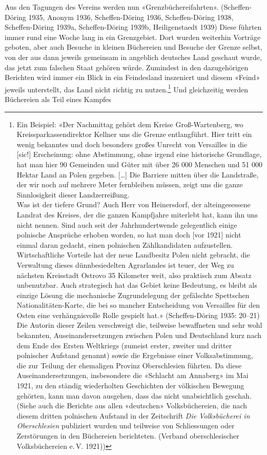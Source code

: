 \documentclass[a4paper,
fontsize=11pt,
oneside,
numbers=noperiodatend,
parskip=half-,
bibliography=totoc,
final
]{scrartcl}
\begin{document}
Aus den Tagungen des Vereins werden nun «Grenzbüchereifahrten».
(Scheffen-Döring 1935, Anonym 1936, Scheffen-Döring 1936,
Scheffen-Döring 1938, Scheffen-Döring 1939a, Scheffen-Döring 1939b,
Heiligenstaedt 1939) Diese führten immer rund eine Woche lang in ein
Grenzgebiet. Dort wurden weiterhin Vorträge geboten, aber auch Besuche
in kleinen Büchereien und Besuche der Grenze selbst, von der aus dann
jeweils gemeinsam in angeblich deutsches Land geschaut wurde, das jetzt
zum falschen Staat gehören würde. Zumindest in den dazugehörigen
Berichten wird immer ein Blick in ein Feindesland inszeniert und diesem
«Feind» jeweils unterstellt, das Land nicht richtig zu
nutzen.\footnote{Ein Beispiel: «Der Nachmittag gehört dem Kreise
  Groß-Wartenberg, wo Kreissparkassendirektor Kellner uns die Grenze
  entlangführt. Hier tritt ein wenig bekanntes und doch besonders großes
  Unrecht von Versailles in die {[}sic!{]} Erscheinung: ohne Abstimmung,
  ohne irgend eine historische Grundlage, hat man hier 90 Gemeinden und
  Güter mit über 26 000 Menschen und 51 000 Hektar Land an Polen
  gegeben. {[}\ldots{]} Die Barriere mitten über die Landstraße, der wir
  noch auf mehrere Meter fernbleiben müssen, zeigt uns die ganze
  Sinnlosigkeit dieser Landzerreißung.\\
  Was ist der tiefere Grund? Auch Herr von Heinersdorf, der
  alteingesessene Landrat des Kreises, der die ganzen Kampfjahre
  miterlebt hat, kann ihn uns nicht nennen. Sind auch seit der
  Jahrhundertwende gelegentlich einige polnische Ansprüche erhoben
  worden, so hat man doch {[}vor 1921{]} nicht einmal daran gedacht,
  einen polnischen Zählkandidaten aufzustellen. Wirtschaftliche Vorteile
  hat der neue Landbesitz Polen nicht gebracht, die Verwaltung dieses
  dünnbesiedelten Agrarlandes ist teuer, der Weg zu nächsten Kreisstadt
  Ostrovo 35 Kilometer weit, also praktisch zum Absatz unbenutzbar. Auch
  strategisch hat das Gebiet keine Bedeutung, es bleibt als einzige
  Lösung die mechanische Zugrundelegung der gefälschte Spettschen
  Nationalitäten-Karte, die bei so mancher Entscheidung von Versailles
  für den Osten eine verhängnisvolle Rolle gespielt hat.»
  (Scheffen-Döring 1935: 20--21)\\
  Die Autorin dieser Zeilen verschweigt die, teilweise bewaffneten und
  sehr wohl bekannten, Auseinandersetzungen zwischen Polen und
  Deutschland kurz nach dem Ende des Ersten Weltkriegs (zumeist erster,
  zweiter und dritter polnischer Aufstand genannt) sowie die Ergebnisse
  einer Volksabstimmung, die zur Teilung der ehemaligen Provinz
  Oberschlesien führten. Da diese Auseinandersetzungen, insbesondere die
  «Schlacht am Annaberg» im Mai 1921, zu den ständig wiederholten
  Geschichten der völkischen Bewegung gehörten, kann man davon ausgehen,
  dass das nicht unabsichtlich geschah. (Siehe auch die Berichte aus
  allen «deutschen» Volksbüchereien, die nach diesem dritten polnischen
  Aufstand in der Zeitschrift \emph{Die Volksbücherei in Oberschlesien}
  publiziert wurden und teilweise von Schliessungen oder Zerstörungen in
  den Büchereien berichteten. (Verband oberschlesischer Volksbüchereien
  e.\,V. 1921))} Und gleichzeitig werden Büchereien als Teil eines Kampfes
\end{document}
